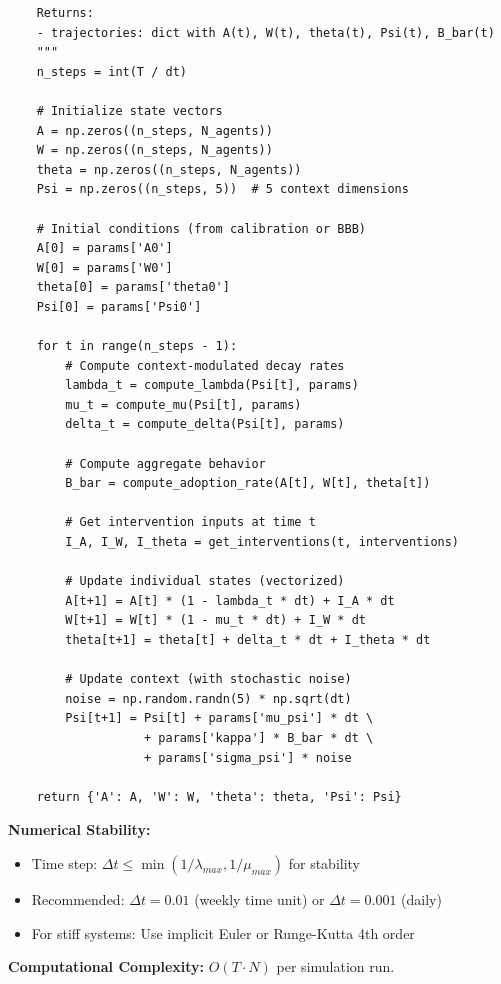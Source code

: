 \begin{tcolorbox}[colback=blue!5!white, colframe=blue!75!black,
    title=\textbf{Method UNTCM-M1: Computational Implementation}]
\begin{verbatim}
    Returns:
    - trajectories: dict with A(t), W(t), theta(t), Psi(t), B_bar(t)
    """
    n_steps = int(T / dt)

    # Initialize state vectors
    A = np.zeros((n_steps, N_agents))
    W = np.zeros((n_steps, N_agents))
    theta = np.zeros((n_steps, N_agents))
    Psi = np.zeros((n_steps, 5))  # 5 context dimensions

    # Initial conditions (from calibration or BBB)
    A[0] = params['A0']
    W[0] = params['W0']
    theta[0] = params['theta0']
    Psi[0] = params['Psi0']

    for t in range(n_steps - 1):
        # Compute context-modulated decay rates
        lambda_t = compute_lambda(Psi[t], params)
        mu_t = compute_mu(Psi[t], params)
        delta_t = compute_delta(Psi[t], params)

        # Compute aggregate behavior
        B_bar = compute_adoption_rate(A[t], W[t], theta[t])

        # Get intervention inputs at time t
        I_A, I_W, I_theta = get_interventions(t, interventions)

        # Update individual states (vectorized)
        A[t+1] = A[t] * (1 - lambda_t * dt) + I_A * dt
        W[t+1] = W[t] * (1 - mu_t * dt) + I_W * dt
        theta[t+1] = theta[t] + delta_t * dt + I_theta * dt

        # Update context (with stochastic noise)
        noise = np.random.randn(5) * np.sqrt(dt)
        Psi[t+1] = Psi[t] + params['mu_psi'] * dt \
                   + params['kappa'] * B_bar * dt \
                   + params['sigma_psi'] * noise

    return {'A': A, 'W': W, 'theta': theta, 'Psi': Psi}
\end{verbatim}

\textbf{Numerical Stability:}
\begin{itemize}[nosep]
\item Time step: $\Delta t \leq \min(1/\lambda_{max}, 1/\mu_{max})$ for stability
\item Recommended: $\Delta t = 0.01$ (weekly time unit) or $\Delta t = 0.001$ (daily)
\item For stiff systems: Use implicit Euler or Runge-Kutta 4th order
\end{itemize}

\textbf{Computational Complexity:} $O(T \cdot N)$ per simulation run.

\end{tcolorbox}

